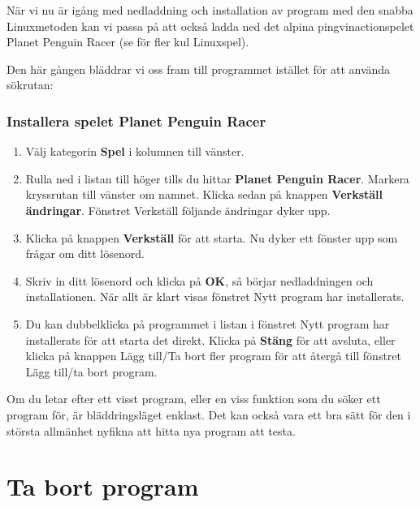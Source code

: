 \documentclass[a4paper,final]{memoir} %
\begin{document}

När vi nu är igång med nedladdning och installation av program med den snabba Linuxmetoden kan vi passa på att också ladda ned det alpina pingvinactionspelet Planet Penguin Racer (se  för fler kul Linuxspel).

Den här gången bläddrar vi oss fram till programmet istället för att använda sökrutan:

\subsubsection{Installera spelet Planet Penguin Racer}

\begin{enumerate}

\item Välj kategorin \textbf{Spel} i kolumnen till vänster.
\item Rulla ned i listan till höger tills du hittar \textbf{Planet Penguin Racer}. Markera kryssrutan till vänster om namnet. Klicka sedan på knappen \textbf{Verkställ ändringar}. Fönstret Verkställ följande ändringar dyker upp.
\item Klicka på knappen \textbf{Verkställ} för att starta. Nu dyker ett fönster upp som frågar om ditt lösenord.
\item Skriv in ditt lösenord och klicka på \textbf{OK}, så börjar nedladdningen och installationen. När allt är klart visas fönstret Nytt program har installerats. 
\item Du kan dubbelklicka på programmet i listan i fönstret Nytt program har installerats för att starta det direkt. Klicka på \textbf{Stäng} för att avsluta, eller klicka på knappen Lägg till/Ta bort fler program för att återgå till fönstret Lägg till/ta bort program.

\end{enumerate}

Om du letar efter ett visst program, eller en viss funktion som du söker ett program för, är bläddringsläget enklast. Det kan också vara ett bra sätt för den i största allmänhet nyfikna att hitta nya program att testa.



\section{Ta bort program}
\end{document}
